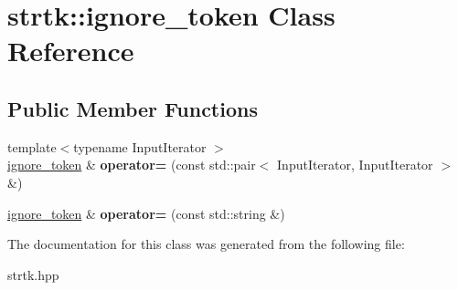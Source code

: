 \hypertarget{classstrtk_1_1ignore__token}{\section{strtk\-:\-:ignore\-\_\-token Class Reference}
\label{classstrtk_1_1ignore__token}
}
\subsection*{Public Member Functions}
\begin{DoxyCompactItemize}
\item 
\hypertarget{classstrtk_1_1ignore__token_a773ce9971728a09ed6371ac11daadb7f}{{\footnotesize template$<$typename Input\-Iterator $>$ }\\\hyperlink{classstrtk_1_1ignore__token}{ignore\-\_\-token} \& {\bfseries operator=} (const std\-::pair$<$ Input\-Iterator, Input\-Iterator $>$ \&)}\label{classstrtk_1_1ignore__token_a773ce9971728a09ed6371ac11daadb7f}

\item 
\hypertarget{classstrtk_1_1ignore__token_aeeaef45e33a650b6c46a69f3e98338b1}{\hyperlink{classstrtk_1_1ignore__token}{ignore\-\_\-token} \& {\bfseries operator=} (const std\-::string \&)}\label{classstrtk_1_1ignore__token_aeeaef45e33a650b6c46a69f3e98338b1}

\end{DoxyCompactItemize}


The documentation for this class was generated from the following file\-:\begin{DoxyCompactItemize}
\item 
strtk.\-hpp\end{DoxyCompactItemize}
